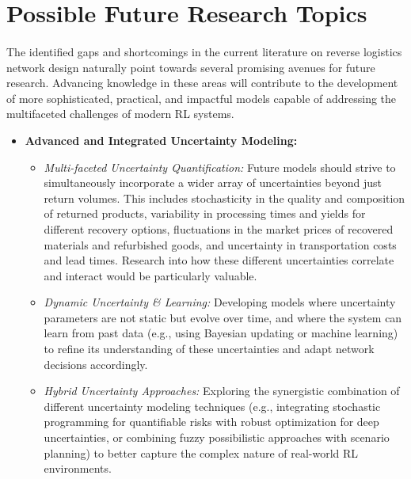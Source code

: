 \section{Possible Future Research Topics}

\paragraph{} The identified gaps and shortcomings in the current literature on reverse logistics network design naturally point towards several promising avenues for future research. Advancing knowledge in these areas will contribute to the development of more sophisticated, practical, and impactful models capable of addressing the multifaceted challenges of modern RL systems.

\begin{itemize}[label=, leftmargin=2mm]
    \item \textbf{Advanced and Integrated Uncertainty Modeling:}
        \begin{itemize}
            \item \textit{Multi-faceted Uncertainty Quantification:} Future models should strive to simultaneously incorporate a wider array of uncertainties beyond just return volumes. This includes stochasticity in the quality and composition of returned products, variability in processing times and yields for different recovery options, fluctuations in the market prices of recovered materials and refurbished goods, and uncertainty in transportation costs and lead times. Research into how these different uncertainties correlate and interact would be particularly valuable.
            \item \textit{Dynamic Uncertainty \& Learning:} Developing models where uncertainty parameters are not static but evolve over time, and where the system can learn from past data (e.g., using Bayesian updating or machine learning) to refine its understanding of these uncertainties and adapt network decisions accordingly.
            \item \textit{Hybrid Uncertainty Approaches:} Exploring the synergistic combination of different uncertainty modeling techniques (e.g., integrating stochastic programming for quantifiable risks with robust optimization for deep uncertainties, or combining fuzzy possibilistic approaches with scenario planning) to better capture the complex nature of real-world RL environments.
        \end{itemize}


\end{itemize}
